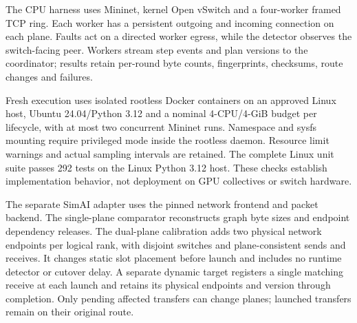\documentclass[sigconf]{acmart}
\begin{document}
The CPU harness uses Mininet, kernel Open vSwitch and a four-worker
framed TCP ring. Each worker has a persistent outgoing and incoming
connection on each plane. Faults act on a directed worker egress, while
the detector observes the switch-facing peer. Workers stream step events
and plan versions to the coordinator; results retain per-round byte
counts, fingerprints, checksums, route changes and failures.

Fresh execution uses isolated rootless Docker containers on an approved
Linux host, Ubuntu 24.04/Python 3.12 and a nominal 4-CPU/4-GiB budget per
lifecycle, with at most two concurrent Mininet runs. Namespace and sysfs
mounting require privileged mode inside the rootless daemon. Resource
limit warnings and actual sampling intervals are retained. The complete
Linux unit suite passes 292 tests on the Linux Python 3.12 host. These checks establish implementation
behavior, not deployment on GPU collectives or switch hardware.

The separate SimAI adapter uses the pinned network frontend and packet
backend. The single-plane comparator reconstructs graph byte sizes and
endpoint dependency releases. The dual-plane calibration adds two
physical network endpoints per logical rank, with disjoint switches and
plane-consistent sends and receives. It changes static slot placement before launch and includes no runtime
detector or cutover delay. A separate dynamic target registers a single
matching receive at each launch and retains its physical endpoints and
version through completion. Only pending affected transfers can change
planes; launched transfers remain on their original route.
\end{document}

